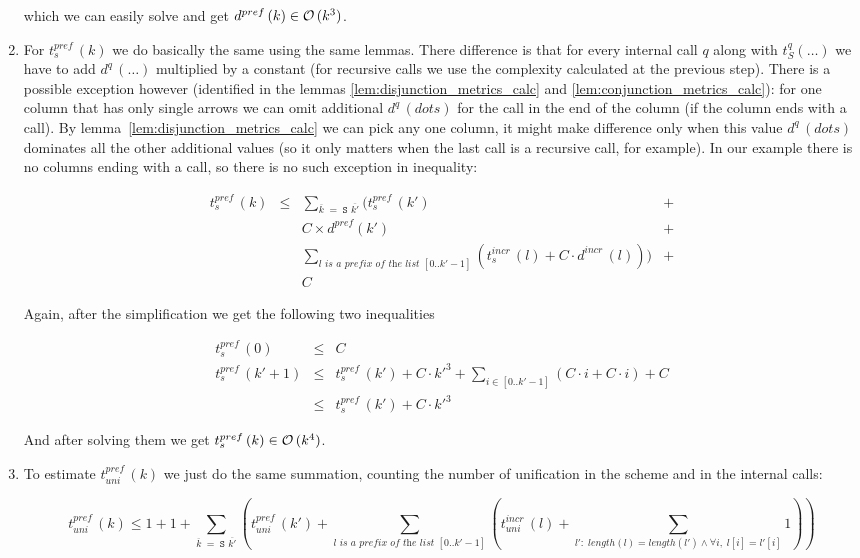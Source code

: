 \begin{enumerate}
which we can easily solve and get $d^{pref}\,(k) \in \mathcal{O}\,(k^3)$.

\item For $t_s^{pref}\,(k)$ we do basically the same using the same lemmas. There difference is that for every internal call $q$ along with $t_S^q(\dots)$ we have to add $d^q\,(\dots)$
  multiplied by a constant (for recursive calls we use the complexity calculated at the previous step). There is a possible exception however (identified in the lemmas \ref{lem:disjunction_metrics_calc} and \ref{lem:conjunction_metrics_calc}): for one column that has only single arrows we can omit additional $d^q\,(dots)$ for the call in the end of the column (if the column ends with a call).
  By lemma~\ref{lem:disjunction_metrics_calc} we can pick any one column, it might make difference only when this value $d^q\,(dots)$ dominates all the other additional values (so it only
  matters when the last call is a recursive call, for example). In our example there is no columns ending with a call, so there is no such exception in inequality:

  \[
\begin{array}{rclc}
  t_s^{pref}\,(k) & \le & \sum_{\overline{k} \;=\; \texttt{S $\overline{k'}$}} (t_s^{pref}\,(k') & + \\
                &     & C \times d^{pref}(k') & + \\
                &     & \sum_{\textit{$l$ is a prefix of the list $[0..k' - 1]$}} (t_s^{incr}\,(l) + C \cdot d^{incr}\,(l))) & +\\
                &     & C &
\end{array}
\]

Again, after the simplification we get the following two inequalities

\[ \begin{array}{rcl}
t_s^{pref}\,(0) &\le& C \\
t_s^{pref}\,(k' + 1) &\le& t_s^{pref}\,(k') + C \cdot k'^3 + \sum_{i \in [0..k' - 1]} (C \cdot i + C \cdot i) + C \\
                  &\le& t_s^{pref}\,(k') + C \cdot k'^3 
\end{array} \]

And after solving them we get $t_s^{pref}\,(k) \in \mathcal{O}\,(k^4)$.

\item To estimate $t_{uni}^{pref}\,(k)$ we just do the same summation, counting the number of unification in the scheme and in the internal calls:

  \[
    t_{uni}^{pref}\,(k) \le 1 + 1 + \sum_{\overline{k} \;=\; \texttt{S $\overline{k'}$}} (t_{uni}^{pref}\,(k') + \sum_{\textit{$l$ is a prefix of the list $[0..k' - 1]$}} (t_{uni}^{incr}\,(l) + \sum_{l': \; length(l) = length(l') \land \forall i, \; l[i] = l'[i]} 1))
    \]


\end{enumerate}
